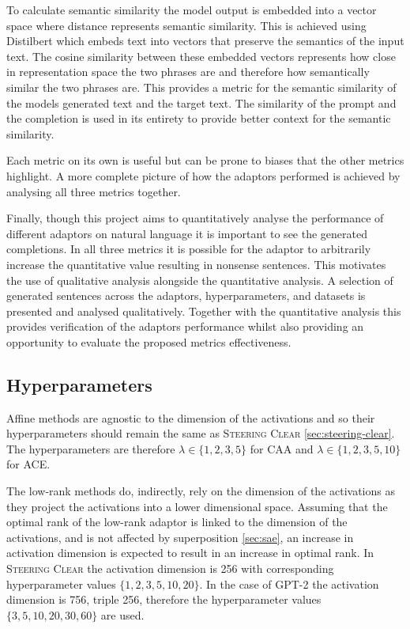 To calculate semantic similarity the model output is embedded into a vector space where distance represents semantic similarity.
This is achieved using Distilbert \citep{distilbert} which embeds text into vectors that preserve the semantics of the input text.
The cosine similarity between these embedded vectors represents how close in representation space the two phrases are and therefore how semantically similar the two phrases are.
This provides a metric for the semantic similarity of the models generated text and the target text.
The similarity of the prompt and the completion is used in its entirety to provide better context for the semantic similarity.

Each metric on its own is useful but can be prone to biases that the other metrics highlight.
A more complete picture of how the adaptors performed is achieved by analysing all three metrics together.

Finally, though this project aims to quantitatively analyse the performance of different adaptors on natural language it is important to see the generated completions.
In all three metrics it is possible for the adaptor to arbitrarily increase the quantitative value resulting in nonsense sentences.
This motivates the use of qualitative analysis alongside the quantitative analysis.
A selection of generated sentences across the adaptors, hyperparameters, and datasets is presented and analysed qualitatively.
Together with the quantitative analysis this provides verification of the adaptors performance whilst also providing an opportunity to evaluate the proposed metrics effectiveness.

\subsection{Hyperparameters}

Affine methods are agnostic to the dimension of the activations and so their hyperparameters should remain the same as {\scshape Steering Clear} \cref{sec:steering-clear}.
The hyperparameters are therefore $\lambda \in \{1, 2, 3, 5\}$ for CAA and $\lambda \in \{1, 2, 3, 5, 10\}$ for ACE.

The low-rank methods do, indirectly, rely on the dimension of the activations as they project the activations into a lower dimensional space.
Assuming that the optimal rank of the low-rank adaptor is linked to the dimension of the activations, and is not affected by superposition \cref{sec:sae}, an increase in activation dimension is expected to result in an increase in optimal rank.
In {\scshape Steering Clear} the activation dimension is 256 with corresponding hyperparameter values $\{1, 2, 3, 5, 10, 20\}$.
In the case of GPT-2 \cite{gpt-2} the activation dimension is 756, triple 256, therefore the hyperparameter values $\{3, 5, 10, 20, 30, 60\}$ are used.

